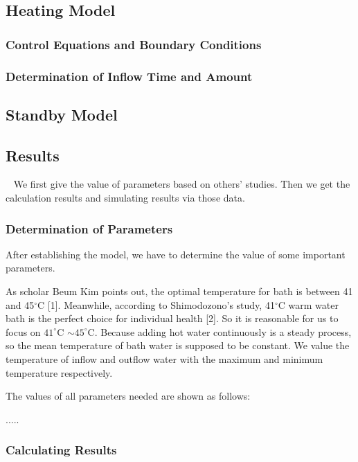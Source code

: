 \documentclass{mcmthesis}
\begin{document}
\subsection{Heating Model}

\subsubsection{Control Equations and Boundary Conditions}

\subsubsection{Determination of Inflow Time and Amount}

\subsection{Standby Model}

\subsection{Results}

\quad~ We first give the value of parameters based on others’ studies. Then we get the calculation results and simulating results via those data.

\subsubsection{Determination of Parameters}

After establishing the model, we have to determine the value of some
important parameters.

As scholar Beum Kim points out, the optimal temperature for bath is
between 41 and 45$^\circ$C [1]. Meanwhile, according to Shimodozono's study, 41$^\circ$C warm water bath is the perfect choice for individual health [2]. So it is reasonable for us to focus on $41^\circ$C $\sim 45^\circ$C. Because adding hot water continuously is a steady process, so the mean temperature of bath water is supposed to be constant. We value the temperature of inflow and outflow water with the maximum and minimum temperature respectively.

The values of all parameters needed are shown as follows:

.....

\subsubsection{Calculating Results}
\end{document}
